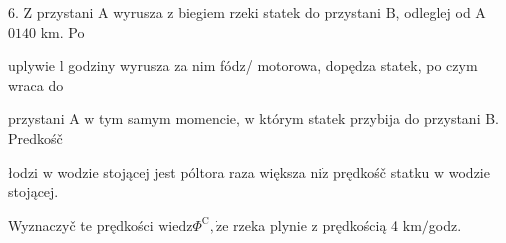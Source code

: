\documentclass[a4paper,12pt]{article}
\begin{document}
6. $\mathrm{Z}$ przystani A wyrusza $\mathrm{z}$ biegiem rzeki statek do przystani $\mathrm{B}$, odleglej od A $0140$ km. Po

uplywie l godziny wyrusza za nim fódz/ motorowa, dopędza statek, po czym wraca do

przystani A $\mathrm{w}$ tym samym momencie, $\mathrm{w}$ którym statek przybija do przystani B. Predkośč

łodzi $\mathrm{w}$ wodzie stojącej jest póltora raza większa $\mathrm{n}\mathrm{i}\dot{\mathrm{z}}$ prędkośč statku $\mathrm{w}$ wodzie stojącej.

Wyznaczyč te prędkości $\mathrm{w}\mathrm{i}\mathrm{e}\mathrm{d}\mathrm{z}\Phi^{\mathrm{C}}, \dot{\mathrm{z}}\mathrm{e}$ rzeka plynie $\mathrm{z}$ prędkością 4 $\mathrm{k}\mathrm{m}/$godz.
\end{document}
